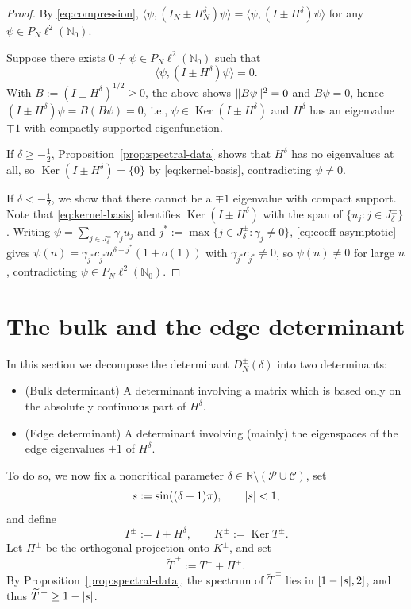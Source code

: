 \documentclass[11pt,a4paper,reqno]{amsart}
\theoremstyle{remark}
\newcommand{\Nzero}{\mathbb N_0}
\newcommand{\Ker}{\operatorname{Ker}}
\newcommand{\id}{I}
\DeclarePairedDelimiter{\abs}{\lvert}{\rvert}
\DeclarePairedDelimiter{\norm}{\lVert}{\rVert}
\begin{document}
\begin{proof}
By \eqref{eq:compression}, $\langle\psi,(\id_N\pm H_N^\delta)\psi\rangle
=\langle\psi,(\id\pm H^\delta)\psi\rangle$ for any $\psi\in P_N\ell^2(\Nzero)$.

Suppose there exists $0\ne\psi\in P_N\ell^2(\Nzero)$ such that
\begin{equation}
    \langle\psi,(\id\pm H^\delta)\psi\rangle = 0.
\end{equation}
With
$B:=(\id\pm H^\delta)^{1/2}\ge0$, the above shows $\norm{B\psi}^2=0$ and $B\psi=0$, hence
$(\id\pm H^\delta)\psi=B(B\psi)=0$, i.e., $\psi\in\Ker(\id\pm H^\delta)$ and $H^\delta$ has an eigenvalue $\mp 1$ with compactly supported eigenfunction.

If $\delta\ge-\frac12$, Proposition~\ref{prop:spectral-data} shows that
$H^\delta$ has no eigenvalues at all, so $\Ker(\id\pm H^\delta)=\{0\}$ by
\eqref{eq:kernel-basis}, contradicting $\psi\ne0$.

If $\delta<-\frac12$, we show that there cannot be a $\mp 1$ eigenvalue with compact support. Note that \eqref{eq:kernel-basis} identifies
$\Ker(\id\pm H^\delta)$ with the span of $\{u_j:j\in J_\delta^\pm\}$. Writing
$\psi=\sum_{j\in J_\delta^\pm}\gamma_ju_j$ and
$j^*:=\max\{j\in J_\delta^\pm:\gamma_j\ne0\}$, \eqref{eq:coeff-asymptotic}
gives $\psi(n)=\gamma_{j^*}c_{j^*}n^{\delta+j^*}(1+o(1))$ with
$\gamma_{j^*}c_{j^*}\ne0$, so $\psi(n)\ne0$ for large $n$, contradicting
$\psi\in P_N\ell^2(\Nzero)$.
\end{proof}

\section{The bulk and the edge determinant}\label{sec:bulk-edge}

In this section we decompose the determinant $D_N^\pm(\delta)$ into two determinants:
\begin{itemize}
    \item[(i)] (Bulk determinant) A determinant involving a matrix which is based only on the absolutely continuous part of  $H^\delta$.
    \item[(ii)] (Edge determinant) A determinant involving (mainly) the eigenspaces of the edge eigenvalues $\pm1$ of $H^\delta$.
\end{itemize}
To do so, we now fix a noncritical parameter $\delta\in\mathbb R\setminus(\mathcal P\cup\mathcal C)$, set
\begin{equation}\label{eq:nonthreshold}
 s:=\sin((\delta +1)\pi),\qquad \abs{s}<1,
\end{equation}
and define
\begin{equation}\label{eq:Tpm}
 T^\pm:=\id\pm H^\delta,
 \qquad
 K^\pm:=\Ker T^\pm.
\end{equation}
Let $\Pi^\pm$ be the orthogonal projection onto $K^\pm$, and set
\begin{equation}\label{eq:Ttilde-pm}
 \widetilde T^{\,\pm}:=T^\pm+\Pi^\pm.
\end{equation}
By Proposition~\ref{prop:spectral-data}, the spectrum of
$\widetilde T^{\,\pm}$ lies in $[1-\abs{s},2]$, and thus
$\widetilde T^{\,\pm}\ge1-\abs{s}$.
\end{document}
